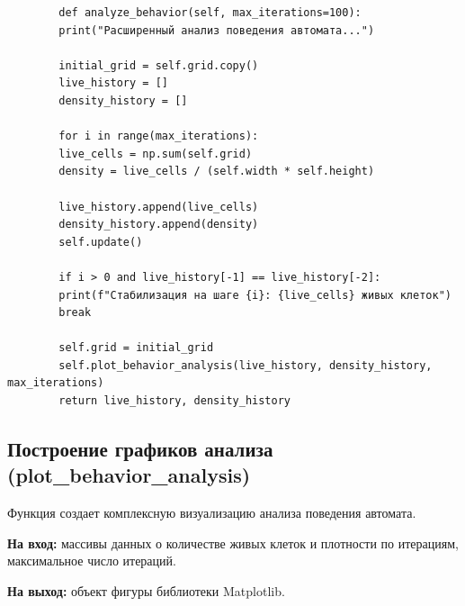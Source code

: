 \documentclass[11pt,a4paper,final]{article}
\begin{document}
	\begin{verbatim}
		def analyze_behavior(self, max_iterations=100):
		print("Расширенный анализ поведения автомата...")
		
		initial_grid = self.grid.copy()
		live_history = []
		density_history = []
		
		for i in range(max_iterations):
		live_cells = np.sum(self.grid)
		density = live_cells / (self.width * self.height)
		
		live_history.append(live_cells)
		density_history.append(density)
		self.update()
		
		if i > 0 and live_history[-1] == live_history[-2]:
		print(f"Стабилизация на шаге {i}: {live_cells} живых клеток")
		break
		
		self.grid = initial_grid
		self.plot_behavior_analysis(live_history, density_history, max_iterations)		
		return live_history, density_history
	\end{verbatim}
	
	\subsection{Построение графиков анализа (plot\_behavior\_analysis)}
	
	Функция создает комплексную визуализацию анализа поведения автомата.
	
	\textbf{На вход:} массивы данных о количестве живых клеток и плотности по итерациям, максимальное число итераций.  
\par \textbf{На выход:} объект фигуры библиотеки Matplotlib.
	
\end{document}
